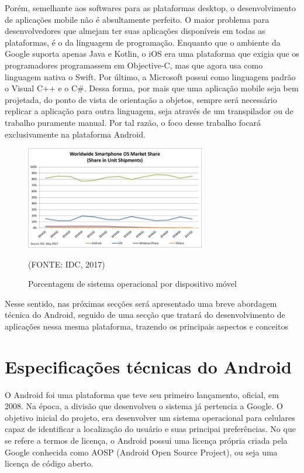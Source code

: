 \documentclass[
    12pt,       %
    openright,      %
    twoside,      %
    a4paper,      %
    english,      %
    french,       %
    spanish,      %
    brazil,       %
    ]{abntex2}
\begin{document}
      Porém, semelhante aos softwares para as plataformas desktop, o desenvolvimento de aplicações
      mobile não é absultamente perfeito. O maior problema para desenvolvedores que almejam
      ter suas aplicações disponíveis em todas as plataformas, é o da linguagem de programação.
      Enquanto que o ambiente da Google suporta apenas Java e Kotlin, o iOS era uma plataforma
      que exigia que os programadores programassem em Objective-C, mas que agora usa como linguagem
      nativa o Swift. Por último, a Microsoft possui como linguagem padrão o Visual C++ e o C\#.
      Dessa forma, por mais que uma aplicação mobile seja bem projetada, do ponto de vista de
      orientação a objetos, sempre será necessário replicar a aplicação para outra linguagem,
      seja através de um transpilador ou de trabalho puramente manual. Por tal razão, o foco
      desse trabalho focará exclusivamente na plataforma Android.

      \begin{figure}[htbp]
            \begin{center}
                \includegraphics[width=0.7\textwidth]{img/osPercentage.jpg}
            \end{center}
        \caption{\label{fig:passaro}Porcentagem de sistema operacional por dispositivo móvel}
        \begin{center}(FONTE: IDC, 2017)\end{center}
      \end{figure}

      Nesse sentido, nas próximas secções será apresentado uma breve abordagem técnica do
      Android, seguido de uma secção que tratará do desenvolvimento de aplicações nessa
      mesma plataforma, trazendo os principais aspectos e conceitos

      \section{Especificações técnicas do Android}
        O Android foi uma plataforma que teve seu primeiro lançamento, oficial, em 2008. Na época,
        a divisão que desenvolveu o sistema já pertencia a Google. O objetivo inicial do projeto,
        era desenvolver um sistema operacional para celulares capaz de identificar a localização
        do usuário e suas principai preferências. No que se refere a termos de licença, o Android
        possui uma licença própria criada pela Google conhecida como AOSP (Android Open Source
        Project), ou seja uma licença de código aberto.
\end{document}
